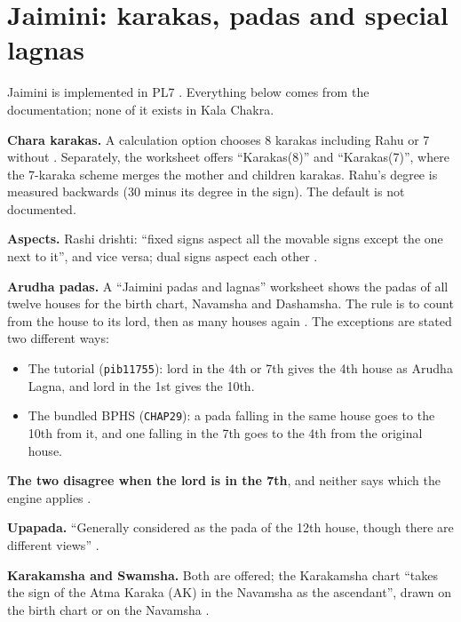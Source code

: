 \section{Jaimini: karakas, padas and special lagnas}
\label{sec:jaimini}

Jaimini is implemented in PL7 \tagDOC. Everything below comes from the documentation; none
of it exists in Kala Chakra.

\textbf{Chara karakas.} A calculation option chooses 8 karakas including Rahu or 7 without
\parencite[p.~192]{geovision2006pl7}. Separately, the worksheet offers ``Karakas(8)'' and
``Karakas(7)'', where the 7-karaka scheme merges the mother and children karakas. Rahu's
degree is measured backwards (30 minus its degree in the sign). The default is not
documented.

\textbf{Aspects.} Rashi drishti: ``fixed signs aspect all the movable signs except the one
next to it'', and vice versa; dual signs aspect each other
\parencite[pp.~216--217]{geovision2006pl7}.

\textbf{Arudha padas.} A ``Jaimini padas and lagnas'' worksheet shows the padas of all twelve
houses for the birth chart, Navamsha and Dashamsha. The rule is to count from the house to
its lord, then as many houses again \parencite[p.~222]{geovision2006pl7}. The exceptions are
stated two different ways:

\begin{itemize}[leftmargin=*]
  \item The tutorial (\texttt{pib11755}): lord in the 4th or 7th gives the 4th house as
  Arudha Lagna, and lord in the 1st gives the 10th.
  \item The bundled BPHS (\texttt{CHAP29}): a pada falling in the same house goes to the
  10th from it, and one falling in the 7th goes to the 4th from the original house.
\end{itemize}

\textbf{The two disagree when the lord is in the 7th}, and neither says which the engine
applies \tagDOC.

\textbf{Upapada.} ``Generally considered as the pada of the 12th house, though there are
different views'' \parencite[p.~230]{geovision2006pl7}.

\textbf{Karakamsha and Swamsha.} Both are offered; the Karakamsha chart ``takes the sign of
the Atma Karaka (AK) in the Navamsha as the ascendant'', drawn on the birth chart or on the
Navamsha \parencite[p.~57]{geovision2006pl7}.

